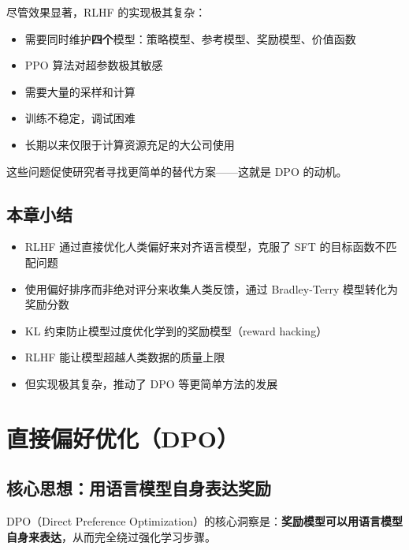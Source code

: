 \documentclass[a4paper]{article}
\begin{document}
尽管效果显著，RLHF 的实现极其复杂：





\begin{itemize}
    \item 需要同时维护\textbf{四个}模型：策略模型、参考模型、奖励模型、价值函数
    \item PPO 算法对超参数极其敏感
    \item 需要大量的采样和计算
    \item 训练不稳定，调试困难
    \item 长期以来仅限于计算资源充足的大公司使用
\end{itemize}

这些问题促使研究者寻找更简单的替代方案——这就是 DPO 的动机。

\subsection{本章小结}

\begin{itemize}
    \item RLHF 通过直接优化人类偏好来对齐语言模型，克服了 SFT 的目标函数不匹配问题
    \item 使用偏好排序而非绝对评分来收集人类反馈，通过 Bradley-Terry 模型转化为奖励分数
    \item KL 约束防止模型过度优化学到的奖励模型（reward hacking）
    \item RLHF 能让模型超越人类数据的质量上限
    \item 但实现极其复杂，推动了 DPO 等更简单方法的发展
\end{itemize}


\section{直接偏好优化（DPO）}

\subsection{核心思想：用语言模型自身表达奖励}

DPO（Direct Preference Optimization）的核心洞察是：\textbf{奖励模型可以用语言模型自身来表达}，从而完全绕过强化学习步骤。


\end{document}
